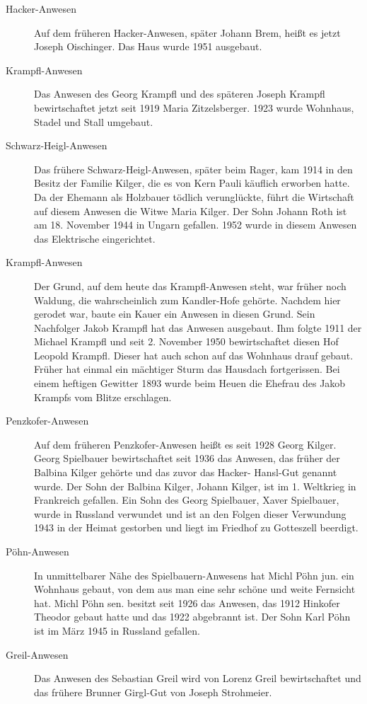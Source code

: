 \documentclass{book}
\begin{document}
\begin{description}
\item[Hacker-Anwesen] Auf dem früheren Hacker-Anwesen, später Johann
Brem, heißt es jetzt Joseph Oischinger. Das Haus wurde 1951 ausgebaut.

\item[Krampfl-Anwesen] Das Anwesen des Georg Krampfl und des späteren
Joseph Krampfl bewirtschaftet jetzt seit 1919 Maria Zitzelsberger. 1923
wurde Wohnhaus, Stadel und Stall umgebaut.

\item[Schwarz-Heigl-Anwesen] Das frühere Schwarz-Heigl-Anwesen, später
beim Rager, kam 1914 in den Besitz der Familie Kilger, die es von Kern
Pauli käuflich erworben hatte. Da der Ehemann als Holzbauer tödlich
verunglückte, führt die Wirtschaft auf diesem Anwesen die Witwe Maria
Kilger. Der Sohn Johann Roth ist am 18. November 1944 in Ungarn
gefallen. 1952 wurde in diesem Anwesen das Elektrische eingerichtet.

\item[Krampfl-Anwesen] Der Grund, auf dem heute das Krampfl-Anwesen
steht, war früher noch Waldung, die wahrscheinlich zum Kandler-Hofe
gehörte. Nachdem hier gerodet war, baute ein Kauer ein Anwesen in diesen
Grund. Sein Nachfolger Jakob Krampfl hat das Anwesen ausgebaut. Ihm
folgte 1911 der Michael Krampfl und seit 2. November 1950 bewirtschaftet
diesen Hof Leopold Krampfl. Dieser hat auch schon auf das Wohnhaus drauf
gebaut. Früher hat einmal ein mächtiger Sturm das Hausdach fortgerissen.
Bei einem heftigen Gewitter 1893 wurde beim Heuen die Ehefrau des Jakob
Krampfs vom Blitze erschlagen.

\item[Penzkofer-Anwesen] Auf dem früheren Penzkofer-Anwesen heißt es
seit 1928 Georg Kilger. Georg Spielbauer bewirtschaftet seit 1936 das
Anwesen, das früher der Balbina Kilger gehörte und das zuvor das Hacker-
Hansl-Gut genannt wurde. Der Sohn der Balbina Kilger, Johann Kilger, ist
im 1. Weltkrieg in Frankreich gefallen. Ein Sohn des Georg Spielbauer,
Xaver Spielbauer, wurde in Russland verwundet und ist an den Folgen
dieser Verwundung 1943 in der Heimat gestorben und liegt im Friedhof zu
Gotteszell beerdigt.

\item[Pöhn-Anwesen] In unmittelbarer Nähe des Spielbauern-Anwesens hat
Michl Pöhn jun. ein Wohnhaus gebaut, von dem aus man eine sehr schöne
und weite Fernsicht hat. Michl Pöhn sen. besitzt seit 1926 das Anwesen,
das 1912 Hinkofer Theodor gebaut hatte und das 1922 abgebrannt ist. Der
Sohn Karl Pöhn ist im März 1945 in Russland gefallen.

\item[Greil-Anwesen] Das Anwesen des Sebastian Greil wird von Lorenz
Greil bewirtschaftet und das frühere Brunner Girgl-Gut von Joseph
Strohmeier.
\end{description}
\end{document}
